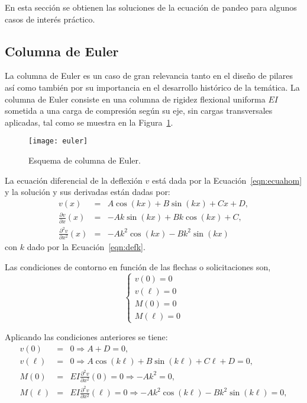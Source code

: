 En esta sección se obtienen las soluciones de la ecuación de pandeo para algunos casos de interés práctico.

\subsection{Columna de Euler}

La columna de Euler es un caso de gran relevancia tanto en el diseño de pilares así como también por su importancia en el desarrollo histórico de la temática.
%
La columna de Euler consiste en una columna de rigidez flexional uniforma $EI$ sometida a una carga de compresión según su eje, sin cargas transversales aplicadas, tal como se muestra en la Figura~\ref{fig:euler}.

\begin{figure}[htb]
	\centering
	\texttt{[image: euler]}
	\caption{Esquema de columna de Euler.}
	\label{fig:euler}
\end{figure}

La ecuación diferencial de la deflexión $v$ está dada por la Ecuación~\eqref{eqn:ecuahom} y la solución y sus derivadas están dadas por:
%
\begin{eqnarray}
v(x) &=& A \cos(k x ) + B \sin(kx) + C x + D, \\
\frac{\partial   v}{\partial x  } (x) &=& -A k \sin(k x ) + B k \cos(kx) + C , \\
\frac{\partial^2 v}{\partial x^2} (x) &=& - A k^2 \cos(k x ) - B k^2 \sin(kx)
\end{eqnarray}
con $k$ dado por la Ecuación~\eqref{eqn:defk}.

Las condiciones de contorno en función de las flechas o solicitaciones son,
%
\begin{equation}
\left\{
\begin{array}{l}
v(0)=0 \\[.5em]
\displaystyle v(\ell)=0\\[.5em]
M(0)=0\\[.5em]
M(\ell)=0
\end{array}
\right.
\end{equation}

Aplicando las condiciones anteriores se tiene:
%
\begin{eqnarray}
v(0) &=& 0 \Rightarrow A + D = 0, \\
v(\ell) &=& 0 \Rightarrow A \cos(k \ell) + B \sin(k \ell) + C \ell + D = 0, \\
M(0) &=& EI \frac {\partial^2 v}{\partial x^2} (0) = 0 \Rightarrow -Ak^2 = 0,  \\
M(\ell) &=& EI \frac{\partial^2 v}{\partial x^2} (\ell) = 0  \Rightarrow -Ak^2\cos(k \ell) -  B k^2 \sin(k\ell) = 0,
\end{eqnarray}

